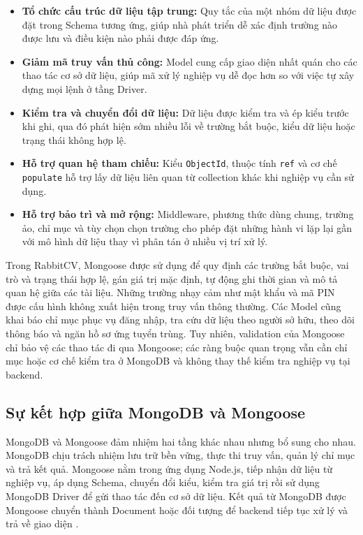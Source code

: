 \begin{itemize}
    \item \textbf{Tổ chức cấu trúc dữ liệu tập trung:} Quy tắc của một nhóm dữ liệu được đặt trong Schema tương ứng, giúp nhà phát triển dễ xác định trường nào được lưu và điều kiện nào phải được đáp ứng.

    \item \textbf{Giảm mã truy vấn thủ công:} Model cung cấp giao diện nhất quán cho các thao tác cơ sở dữ liệu, giúp mã xử lý nghiệp vụ dễ đọc hơn so với việc tự xây dựng mọi lệnh ở tầng Driver.

    \item \textbf{Kiểm tra và chuyển đổi dữ liệu:} Dữ liệu được kiểm tra và ép kiểu trước khi ghi, qua đó phát hiện sớm nhiều lỗi về trường bắt buộc, kiểu dữ liệu hoặc trạng thái không hợp lệ.

    \item \textbf{Hỗ trợ quan hệ tham chiếu:} Kiểu \texttt{ObjectId}, thuộc tính \texttt{ref} và cơ chế \texttt{populate} hỗ trợ lấy dữ liệu liên quan từ collection khác khi nghiệp vụ cần sử dụng.

    \item \textbf{Hỗ trợ bảo trì và mở rộng:} Middleware, phương thức dùng chung, trường ảo, chỉ mục và tùy chọn chọn trường cho phép đặt những hành vi lặp lại gần với mô hình dữ liệu thay vì phân tán ở nhiều vị trí xử lý.
\end{itemize}

Trong RabbitCV, Mongoose được sử dụng để quy định các trường bắt buộc, vai trò và trạng thái hợp lệ, gán giá trị mặc định, tự động ghi thời gian và mô tả quan hệ giữa các tài liệu. Những trường nhạy cảm như mật khẩu và mã PIN được cấu hình không xuất hiện trong truy vấn thông thường. Các Model cũng khai báo chỉ mục phục vụ đăng nhập, tra cứu dữ liệu theo người sở hữu, theo dõi thông báo và ngăn hồ sơ ứng tuyển trùng. Tuy nhiên, validation của Mongoose chỉ bảo vệ các thao tác đi qua Mongoose; các ràng buộc quan trọng vẫn cần chỉ mục hoặc cơ chế kiểm tra ở MongoDB và không thay thế kiểm tra nghiệp vụ tại backend.

\subsection{Sự kết hợp giữa MongoDB và Mongoose}

MongoDB và Mongoose đảm nhiệm hai tầng khác nhau nhưng bổ sung cho nhau. MongoDB chịu trách nhiệm lưu trữ bền vững, thực thi truy vấn, quản lý chỉ mục và trả kết quả. Mongoose nằm trong ứng dụng Node.js, tiếp nhận dữ liệu từ nghiệp vụ, áp dụng Schema, chuyển đổi kiểu, kiểm tra giá trị rồi sử dụng MongoDB Driver để gửi thao tác đến cơ sở dữ liệu. Kết quả từ MongoDB được Mongoose chuyển thành Document hoặc đối tượng để backend tiếp tục xử lý và trả về giao diện \cite{mongodbdocs,mongooseDocs}.

